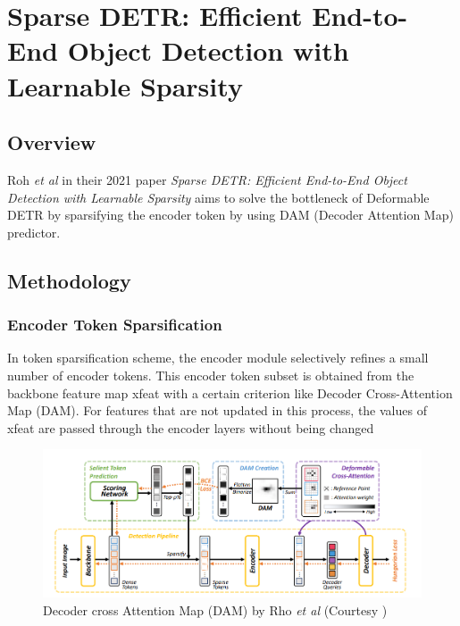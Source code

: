 \section{Sparse DETR: Efficient End-to-End Object Detection with Learnable Sparsity}

\label{appendix:sparse-detr-paper}

\subsection{Overview}

\par Roh \textit{et al} in their 2021 paper \textit{Sparse DETR: Efficient End-to-End Object Detection with Learnable Sparsity} aims to solve the bottleneck of Deformable DETR by sparsifying the encoder token by using DAM (Decoder Attention Map) predictor.\par

\subsection{Methodology}
\subsubsection{Encoder Token Sparsification} 
\par In token sparsification scheme, the encoder module selectively refines a small number of encoder tokens. This encoder token subset is obtained from the backbone feature map xfeat with a certain criterion like Decoder Cross-Attention Map (DAM). For features that are not updated in this process, the values of xfeat are passed through the encoder layers without being changed

\begin{figure}[h]
	\centering
	\includegraphics[width=\linewidth]{assets/img/sparse-detr-dam.png}
	\caption{ Decoder cross Attention Map (DAM) by Rho
		\textit{et al} (Courtesy \cite{sparse-detr})}
\end{figure}

